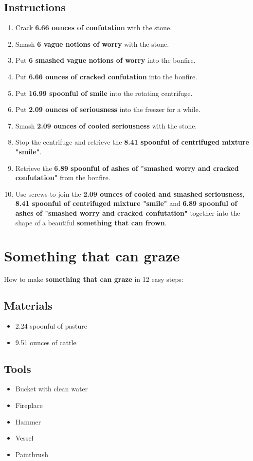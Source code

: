 \documentclass{article}
\begin{document}
\subsection{Instructions}\begin{enumerate}
\item 
Crack \textbf{6.66 ounces of confutation} with the stone.
\item 
Smash \textbf{6 vague notions of worry} with the stone.
\item 
Put \textbf{6 smashed vague notions of worry} into the bonfire.
\item 
Put \textbf{6.66 ounces of cracked confutation} into the bonfire.
\item 
Put \textbf{16.99 spoonful of smile} into the rotating centrifuge.
\item 
Put \textbf{2.09 ounces of seriousness} into the freezer for a while.
\item 
Smash \textbf{2.09 ounces of cooled seriousness} with the stone.
\item 
Stop the centrifuge and retrieve the \textbf{8.41 spoonful of centrifuged mixture "smile"}.
\item 
Retrieve the \textbf{6.89 spoonful of ashes of "smashed worry and cracked confutation"} from the bonfire.
\item 
Use screws to join the \textbf{2.09 ounces of cooled and smashed seriousness}, \textbf{8.41 spoonful of centrifuged mixture "smile"} and \textbf{6.89 spoonful of ashes of "smashed worry and cracked confutation"} together into the shape of a beautiful \textbf{something that can frown}.
\end{enumerate}
\newpage
\section{Something that can graze}How to make \textbf{something that can graze} in 12 easy steps:

\subsection{Materials}\begin{itemize}
\item 
2.24 spoonful of pasture
\item 
9.51 ounces of cattle
\end{itemize}
\subsection{Tools}\begin{itemize}
\item 
Bucket with clean water
\item 
Fireplace
\item 
Hammer
\item 
Vessel
\item 
Paintbrush
\end{itemize}
\end{document}
